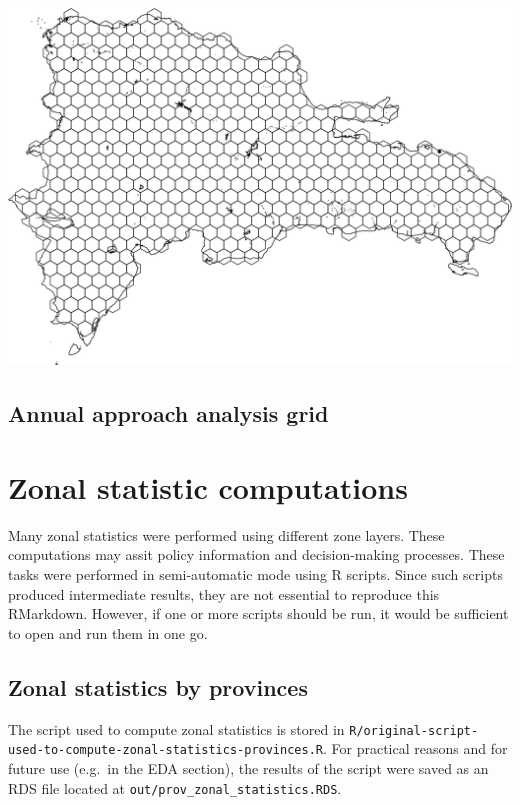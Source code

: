 \documentclass[10pt,landscape,a3paper]{article}
\begin{document}
\begin{center}\includegraphics{img/regular-grid-1} \end{center}

\hypertarget{annual-approach-analysis-grid}{%
\subsection{Annual approach analysis
grid}\label{annual-approach-analysis-grid}}

\hypertarget{zonal-statistic-computations}{%
\section{Zonal statistic
computations}\label{zonal-statistic-computations}}

Many zonal statistics were performed using different zone layers. These
computations may assit policy information and decision-making processes.
These tasks were performed in semi-automatic mode using R scripts. Since
such scripts produced intermediate results, they are not essential to
reproduce this RMarkdown. However, if one or more scripts should be run,
it would be sufficient to open and run them in one go.

\hypertarget{zonal-statistics-by-provinces}{%
\subsection{Zonal statistics by
provinces}\label{zonal-statistics-by-provinces}}

The script used to compute zonal statistics is stored in
\texttt{R/original-script-used-to-compute-zonal-statistics-provinces.R}.
For practical reasons and for future use (e.g.~in the EDA section), the
results of the script were saved as an RDS file located at
\texttt{out/prov\_zonal\_statistics.RDS}.
\end{document}
